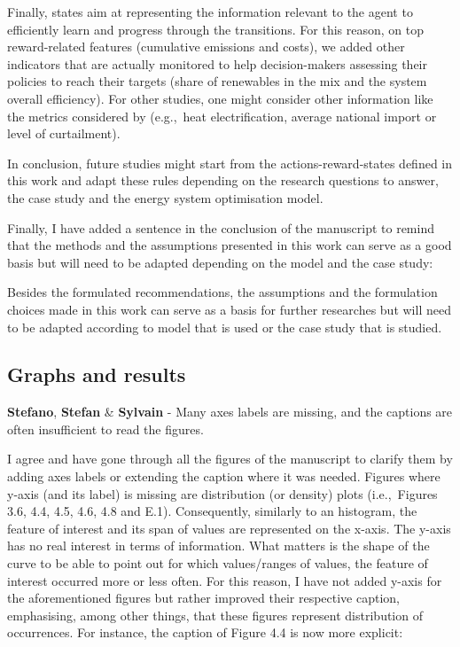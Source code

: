 \documentclass[12pt,a4paper]{article}
\def\eg{e.g.,\ }
\def\ie{i.e.,\ }
\begin{document}
\begin{mdframed}[style=manuscript]
Finally, states aim at representing the information relevant to the agent to efficiently learn and progress through the transitions. For this reason, on top reward-related features (cumulative emissions and costs), we added other indicators that are actually monitored to help decision-makers assessing their policies to reach their targets (share of renewables in the mix and the system overall efficiency). For other studies, one might consider other information like the metrics considered by \citet{pickering2022diversity} (\eg heat electrification, average national import or level of curtailment).

In conclusion, future studies might start from the actions-reward-states defined in this work and adapt these rules depending on the research questions to answer, the case study and the energy system optimisation model.
\end{mdframed}

Finally, I have added a sentence {\color{blue}in the conclusion of the manuscript} to remind that the methods and the assumptions presented in this work can serve as a good basis but will need to be adapted depending on the model and the case study:

\begin{mdframed}[style=manuscript] %
Besides the formulated recommendations, the assumptions and the formulation choices made in this work can serve as a basis for further researches but will need to be adapted according to model that is used or the case study that is studied.
\end{mdframed}

\subsection{Graphs and results}
\label{general_graphs_results}

\begin{mdframed}[style=comment] %
{\color{orange} \textbf{Stefano}}, {\color{teal} \textbf{Stefan}} \& {\color{purple} \textbf{Sylvain}} - Many axes labels are missing, and the captions are often insufficient to read the figures. 
\end{mdframed}

\noindent I agree and have gone through all the figures of the manuscript to clarify them by adding axes labels or extending the caption where it was needed. Figures where y-axis (and its label) is missing are distribution (or density) plots (\ie Figures 3.6, 4.4, 4.5, 4.6, 4.8 and E.1).  Consequently, similarly to an histogram, the feature of interest and its span of values are represented on the x-axis. The y-axis has no real interest in terms of information. What matters is the shape of the curve to be able to point out for which values/ranges of values, the feature of interest occurred more or less often.  For this reason, I have not added y-axis for the aforementioned figures but rather improved their respective caption, emphasising, among other things, that these figures represent distribution of occurrences. For instance, the caption of {\color{blue}Figure 4.4} is now more explicit:
\end{document}
